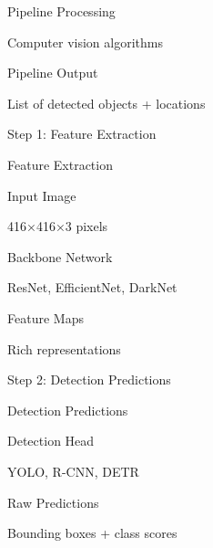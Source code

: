 \documentclass[usenames,dvipsnames]{beamer}
\begin{document}
	\begin{frame}{Pipeline Processing}
		\begin{center}
		\Large Computer vision algorithms
		\end{center}
	\end{frame}
	
	\begin{frame}{Pipeline Output}
		\begin{center}
		\Large List of detected objects + locations
		\end{center}
	\end{frame}
	
	\begin{frame}{Step 1: Feature Extraction}
		\begin{center}
		\Large Feature Extraction
		\end{center}
	\end{frame}
	
	\begin{frame}{Input Image}
		\begin{center}
		\Large 416×416×3 pixels
		\end{center}
	\end{frame}
	
	\begin{frame}{Backbone Network}
		\begin{center}
		\Large ResNet, EfficientNet, DarkNet
		\end{center}
	\end{frame}
	
	\begin{frame}{Feature Maps}
		\begin{center}
		\Large Rich representations
		\end{center}
	\end{frame}
	
	\begin{frame}{Step 2: Detection Predictions}
		\begin{center}
		\Large Detection Predictions
		\end{center}
	\end{frame}
	
	\begin{frame}{Detection Head}
		\begin{center}
		\Large YOLO, R-CNN, DETR
		\end{center}
	\end{frame}
	
	\begin{frame}{Raw Predictions}
		\begin{center}
		\Large Bounding boxes + class scores
		\end{center}
	\end{frame}
	
\end{document}
